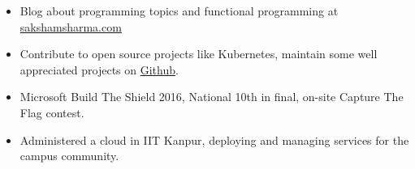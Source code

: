 \vspace{-0.2cm}


{\fontsize{11pt}{1em}\bodyfontlight\upshape\color{text}
\begin{itemize}
  \itemsep-0.3em
  \item Blog about programming topics and functional programming at \href{https://sakshamsharma.com}{sakshamsharma.com}
  \item Contribute to open source projects like Kubernetes, maintain some well appreciated
    projects on \href{https://github.com/sakshamsharma}{Github}.
  \item Microsoft Build The Shield 2016, National 10th in final,
    on-site Capture The Flag contest.
  \item Administered a cloud in IIT Kanpur, deploying and managing services for the campus community.
\end{itemize}
}

